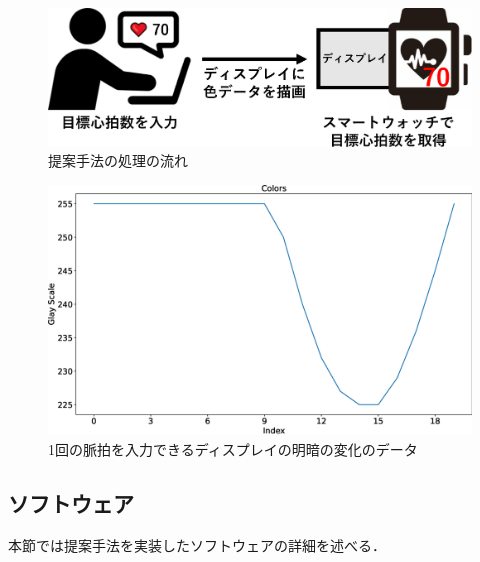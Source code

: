 \documentclass[Japanese,noauthor]{dicomopapers}
\begin{document}
\begin{figure}[!t]
  \begin{center}
    \includegraphics[width=1\linewidth]{figures/method.eps}
  \end{center}
  \caption{提案手法の処理の流れ}
  \label{fig:method}
\end{figure}

\begin{figure}[!t]
  \begin{center}
    \includegraphics[width=1\linewidth]{figures/colors_wave.eps}
  \end{center}
  \caption{1回の脈拍を入力できるディスプレイの明暗の変化のデータ}
  \label{fig:colors_wave}
\end{figure}


\subsection{ソフトウェア}
\label{subsec:software}
本節では提案手法を実装したソフトウェアの詳細を述べる．
\end{document}
